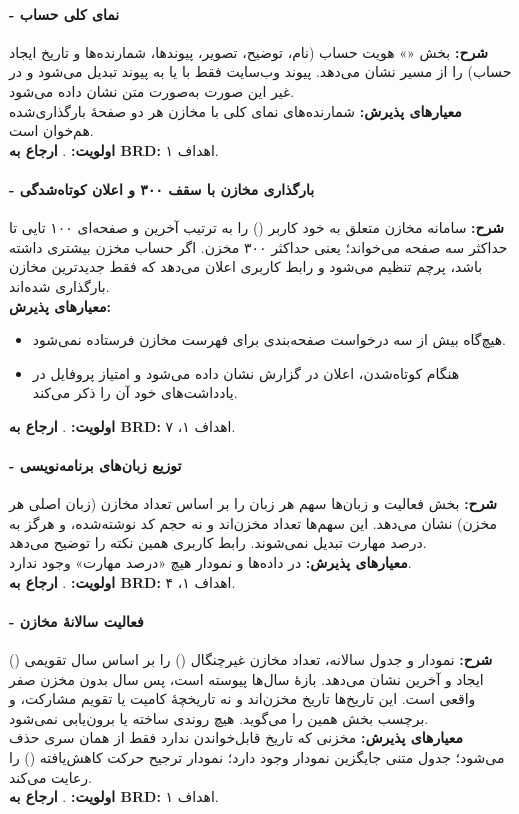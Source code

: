 \documentclass[12pt]{article}
\newcommand{\code}[1]{\lr{\texttt{#1}}}
\begin{document}
 \paragraph{ - نمای کلی حساب}
\textbf{شرح:} بخش «» هویت حساب (نام، توضیح، تصویر، پیوندها، شمارنده‌ها و تاریخ ایجاد حساب) را از مسیر \code{/api/profile/[user]} نشان می‌دهد. پیوند وب‌سایت فقط با  یا  به پیوند تبدیل می‌شود و در غیر این صورت به‌صورت متن نشان داده می‌شود.
\\
\textbf{معیارهای پذیرش:} شمارنده‌های نمای کلی با مخازن هر دو صفحهٔ بارگذاری‌شده هم‌خوان است.
\\
\textbf{اولویت:} . \textbf{ارجاع به BRD:} اهداف ۱.
 \paragraph{ - بارگذاری مخازن با سقف ۳۰۰ و اعلان کوتاه‌شدگی}
\textbf{شرح:} سامانه مخازن متعلق به خود کاربر (\code{type=owner}) را به ترتیب آخرین  و صفحه‌ای ۱۰۰ تایی تا حداکثر سه صفحه می‌خواند؛ یعنی حداکثر ۳۰۰ مخزن. اگر حساب مخزن بیشتری داشته باشد، پرچم  تنظیم می‌شود و رابط کاربری اعلان می‌دهد که فقط جدیدترین مخازن بارگذاری شده‌اند.
\\
\textbf{معیارهای پذیرش:}
\begin{itemize}
\item هیچ‌گاه بیش از سه درخواست صفحه‌بندی برای فهرست مخازن فرستاده نمی‌شود.
\item هنگام کوتاه‌شدن، اعلان در گزارش نشان داده می‌شود و امتیاز پروفایل در یادداشت‌های خود آن را ذکر می‌کند.
\end{itemize}
\textbf{اولویت:} . \textbf{ارجاع به BRD:} اهداف ۱، ۷.
 \paragraph{ - توزیع زبان‌های برنامه‌نویسی}
\textbf{شرح:} بخش فعالیت و زبان‌ها سهم هر زبان را بر اساس تعداد مخازن (زبان اصلی هر مخزن) نشان می‌دهد. این سهم‌ها تعداد مخزن‌اند و نه حجم کد نوشته‌شده، و هرگز به درصد مهارت تبدیل نمی‌شوند. رابط کاربری همین نکته را توضیح می‌دهد.
\\
\textbf{معیارهای پذیرش:} در داده‌ها و نمودار هیچ «درصد مهارت» وجود ندارد.
\\
\textbf{اولویت:} . \textbf{ارجاع به BRD:} اهداف ۱، ۴.
 \paragraph{ - فعالیت سالانهٔ مخازن}
\textbf{شرح:} نمودار و جدول سالانه، تعداد مخازن غیرچنگال () را بر اساس سال تقویمی () ایجاد و آخرین  نشان می‌دهد. بازهٔ سال‌ها پیوسته است، پس سال بدون مخزن صفر واقعی است. این تاریخ‌ها تاریخ مخزن‌اند و نه تاریخچهٔ کامیت یا تقویم مشارکت، و برچسب بخش همین را می‌گوید. هیچ روندی ساخته یا برون‌یابی نمی‌شود.
\\
\textbf{معیارهای پذیرش:} مخزنی که تاریخ قابل‌خواندن ندارد فقط از همان سری حذف می‌شود؛ جدول متنی جایگزین نمودار وجود دارد؛ نمودار ترجیح حرکت کاهش‌یافته () را رعایت می‌کند.
\\
\textbf{اولویت:} . \textbf{ارجاع به BRD:} اهداف ۱.
\end{document}
